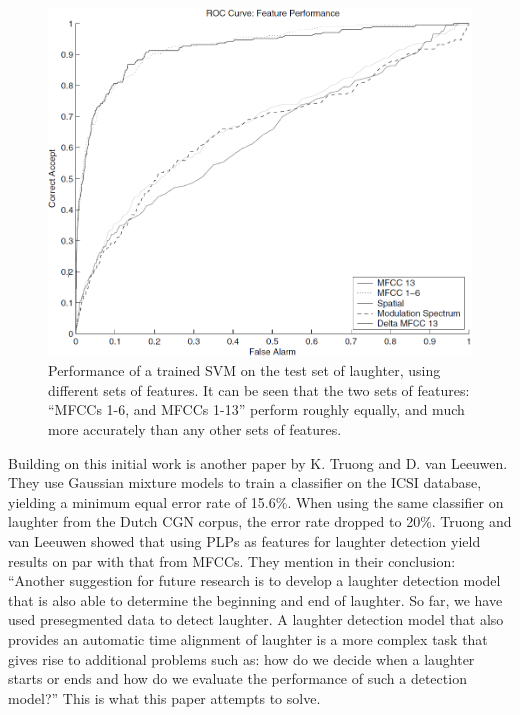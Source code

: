 \documentclass[a4paper,11pt,notitlepage]{article}
\begin{document}
\begin{figure}[H]
	\centering
	\includegraphics[scale = 0.4]{figs/icsi_performance_features.png}
	\caption{Performance of a trained SVM on the test set of laughter, using different sets of features. It can be seen that the two sets of features: ``MFCCs 1-6, and MFCCs 1-13'' perform roughly equally, and much more accurately than any other sets of features.}
	\label{icsi_performance_features}
\end{figure}
Building on this initial work is another paper by K. Truong and D. van Leeuwen\cite{truong2007automatic}. They use Gaussian mixture models to train a classifier on the ICSI database, yielding a minimum equal error rate of 15.6\%. When using the same classifier on laughter from the Dutch CGN corpus, the error rate dropped to 20\%. Truong and van Leeuwen showed that using PLPs as features for laughter detection yield results on par with that from MFCCs. They mention in their conclusion: ``Another suggestion for future research is to develop a laughter detection model that is also able to determine the beginning and end of laughter. So far, we have used presegmented data to detect laughter. A laughter detection model that also provides an automatic time alignment of laughter is a more complex task that gives rise to additional problems such as: how do we decide when a laughter starts or ends and how do we evaluate the performance of such a detection model?''\cite{truong2007automatic} This is what this paper attempts to solve.\\
\\
\end{document}

